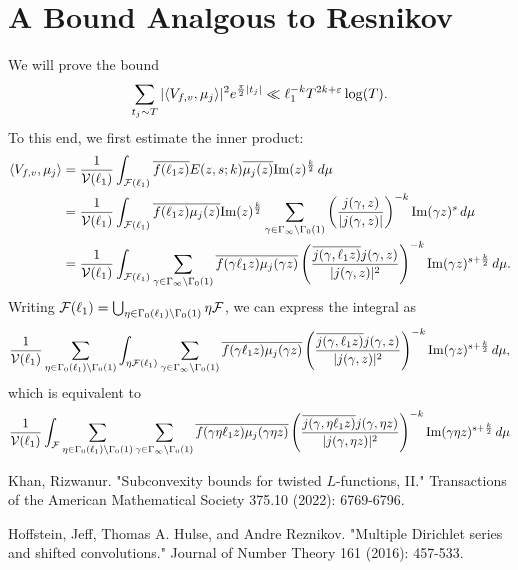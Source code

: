 \documentclass[12pt,reqno,oneside]{amsart}
\begin{document}
\section*{A Bound Analgous to Resnikov}
  We will prove the bound
  \[
    \sum_{t_{j} \sim T}|\langle V_{f,v},\mu_{j}\rangle|^{2}e^{\frac{\pi}{2}|t_{j}|} \ll \ell_{1}^{-k}T^{2k+\varepsilon}\log(T).
  \]
  To this end, we first estimate the inner product:
  \begin{align*}
    \langle V_{f,v},\mu_{j}\rangle &= \frac{1}{\mathcal{V}(\ell_{1})}\int_{\mathcal{F}(\ell_{1})}\overline{f(\ell_{1}z)}E(z,s;k)\overline{\mu_{j}(z)}\mathrm{Im}(z)^{\frac{k}{2}}\,d\mu \\
    &= \frac{1}{\mathcal{V}(\ell_{1})}\int_{\mathcal{F}(\ell_{1})}\overline{f(\ell_{1}z)}\overline{\mu_{j}(z)}\mathrm{Im}(z)^{\frac{k}{2}}\sum_{\gamma \in \Gamma_{\infty}\backslash\Gamma_{0}(1)}\left(\frac{j(\gamma,z)}{|j(\gamma,z)|}\right)^{-k}\mathrm{Im}(\gamma z)^{s}\,d\mu \\
    &= \frac{1}{\mathcal{V}(\ell_{1})}\int_{\mathcal{F}(\ell_{1})}\sum_{\gamma \in \Gamma_{\infty}\backslash\Gamma_{0}(1)}\overline{f(\gamma\ell_{1} z)}\overline{\mu_{j}(\gamma z)}\left(\frac{\overline{j(\gamma,\ell_{1}z)}j(\gamma,z)}{|j(\gamma,z)|^{2}}\right)^{-k}\mathrm{Im}(\gamma z)^{s+\frac{k}{2}}\,d\mu.
  \end{align*}
  Writing $\mathcal{F}(\ell_{1}) = \bigcup_{\eta \in \Gamma_{0}(\ell_{1})\backslash\Gamma_{0}(1)}\eta\mathcal{F}$, we can express the integral as
  \[
    \frac{1}{\mathcal{V}(\ell_{1})}\sum_{\eta \in \Gamma_{0}(\ell_{1})\backslash\Gamma_{0}(1)}\int_{\eta\mathcal{F}(\ell_{1})}\sum_{\gamma \in \Gamma_{\infty}\backslash\Gamma_{0}(1)}\overline{f(\gamma\ell_{1} z)}\overline{\mu_{j}(\gamma z)}\left(\frac{\overline{j(\gamma,\ell_{1}z)}j(\gamma,z)}{|j(\gamma,z)|^{2}}\right)^{-k}\mathrm{Im}(\gamma z)^{s+\frac{k}{2}}\,d\mu,
  \]
  which is equivalent to
  \[
    \frac{1}{\mathcal{V}(\ell_{1})}\int_{\mathcal{F}}\sum_{\eta \in \Gamma_{0}(\ell_{1})\backslash\Gamma_{0}(1)}\sum_{\gamma \in \Gamma_{\infty}\backslash\Gamma_{0}(1)}\overline{f(\gamma\eta\ell_{1} z)}\overline{\mu_{j}(\gamma\eta z)}\left(\frac{\overline{j(\gamma,\eta \ell_{1}z)}j(\gamma,\eta z)}{|j(\gamma,\eta z)|^{2}}\right)^{-k}\mathrm{Im}(\gamma\eta z)^{s+\frac{k}{2}}\,d\mu
  \]



\begin{thebibliography}{99}
  Khan, Rizwanur. "Subconvexity bounds for twisted $L$-functions, II." Transactions of the American Mathematical Society 375.10 (2022): 6769-6796.

  Hoffstein, Jeff, Thomas A. Hulse, and Andre Reznikov. "Multiple Dirichlet series and shifted convolutions." Journal of Number Theory 161 (2016): 457-533.
\end{thebibliography}
\end{document}
